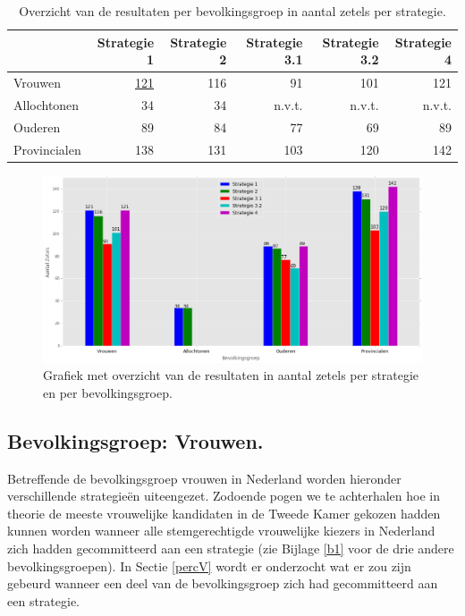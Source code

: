\begin{table}[h]
\captionsetup{skip=-2pt}
\begin{center}
\begin{footnotesize}
\begin{tabular}{lrrrrr}
\toprule
{} &  Strategie 1 &  Strategie 2 &  Strategie 3.1 &  Strategie 3.2 &  Strategie 4 \\
\midrule
Vrouwen      &         \hyperref[S1V]{121} &          116 &             91 &            101 &          121 \\
Allochtonen  &           34 &           34 &            n.v.t. &           n.v.t. &          n.v.t. \\
Ouderen      &           89 &           84 &             77 &             69 &           89 \\
Provincialen &          138 &          131 &            103 &            120 &          142 \\
\bottomrule
			
			
\end{tabular}
\end{footnotesize}
\end{center}
\caption{Overzicht van de resultaten per bevolkingsgroep in aantal zetels per strategie.}
\label{table:S_overzicht} 
\end{table}


\begin{figure}[H]
\captionsetup{skip=0pt}

	\includegraphics[width=0.95\linewidth]{overzicht_resultaten_strategien_plot1.png}

			\caption{Grafiek met overzicht van de resultaten in aantal zetels per strategie en per bevolkingsgroep.}

\label{fig:S_overzicht}
\end{figure}


\subsection{Bevolkingsgroep: Vrouwen.}
\label{vrouwen}
Betreffende de bevolkingsgroep vrouwen in Nederland worden hieronder verschillende strategie\"{e}n uiteengezet. Zodoende pogen we te achterhalen hoe in theorie de meeste vrouwelijke kandidaten in de Tweede Kamer gekozen hadden kunnen worden wanneer alle stemgerechtigde vrouwelijke kiezers in Nederland zich hadden gecommitteerd aan een strategie (zie Bijlage \ref{b1} voor de drie andere bevolkingsgroepen). In Sectie \ref{percV} wordt er onderzocht wat er zou zijn gebeurd wanneer een deel van de bevolkingsgroep zich had gecommitteerd aan een strategie. 


